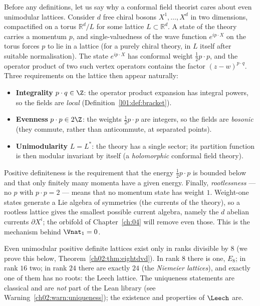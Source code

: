 Before any definitions, let us say why a conformal field theorist cares about even unimodular
lattices.  Consider $d$ free chiral bosons $X^1,\dots,X^d$ in two dimensions, compactified on a
torus $\mathbb{R}^d/L$ for some lattice $L\subset\mathbb{R}^d$.  A state of the theory carries a
momentum $p$, and single-valuedness of the wave function $e^{i p\cdot X}$ on the torus forces $p$
to lie in a lattice (for a purely chiral theory, in $L$ itself after suitable normalisation).  The
state $e^{ip\cdot X}$ has conformal weight $\tfrac12 p\cdot p$, and the operator product of two
such vertex operators contains the factor $(z-w)^{p\cdot q}$.  Three requirements on the lattice
then appear naturally:
\begin{itemize}
  \item \textbf{Integrality} $p\cdot q\in\Z$: the operator product expansion has integral powers,
        so the fields are \emph{local} (Definition~\ref{l01:def:bracket}).
  \item \textbf{Evenness} $p\cdot p\in2\Z$: the weights $\tfrac12 p\cdot p$ are integers, so the
        fields are \emph{bosonic} (they commute, rather than anticommute, at separated points).
  \item \textbf{Unimodularity} $L=L^*$: the theory has a single sector; its partition function
        is then modular invariant by itself (a \emph{holomorphic} conformal field theory).
\end{itemize}
Positive definiteness is the requirement that the energy $\tfrac12 p\cdot p$ is bounded below
and that only finitely many momenta have a given energy.  Finally, \emph{rootlessness} --- no $p$
with $p\cdot p=2$ --- means that no momentum state has weight $1$.  Weight-one states generate a
Lie algebra of symmetries (the currents of the theory), so a rootless lattice gives the smallest
possible current algebra, namely the $d$ abelian currents $\partial X^i$; the orbifold of
Chapter~\ref{ch:04} will remove even those.  This is the mechanism behind $\Vnat_1=0$.

Even unimodular positive definite lattices exist only in ranks divisible by $8$ (we prove this
below, Theorem~\ref{ch02:thm:eightdvd}).  In rank $8$ there is one, $E_8$; in rank $16$ two; in
rank $24$ there are exactly $24$ (the \emph{Niemeier lattices}), and exactly one of them has no
roots: the Leech lattice.  The uniqueness statements are classical and are \emph{not} part of the
Lean library (see Warning~\ref{ch02:warn:uniqueness}); the existence and properties of $\Leech$
are.

